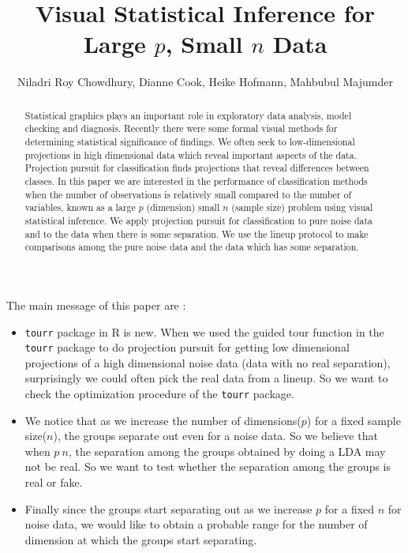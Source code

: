 \documentclass[12]{article}
\begin{document}


\title{Visual Statistical Inference for Large $p$, Small $n$ Data}\label{ch:largepsmalln}
\vspace{-0.8cm}
\author{Niladri Roy Chowdhury, Dianne Cook, Heike Hofmann, Mahbubul Majumder}



\maketitle

\begin{abstract}
Statistical graphics plays an important role in exploratory data analysis, model checking and diagnosis. Recently there were some formal visual methods for determining statistical significance of findings. We often seek to low-dimensional projections in high dimensional data which reveal important aspects of the data. Projection pursuit for classification finds projections that reveal differences between classes. In this paper we are interested in the performance of classification methods when the number of observations is relatively small compared to the number of variables, known as a large $p$ (dimension) small $n$ (sample size) problem using visual statistical inference. We apply projection pursuit for classification to pure noise data and to the data when there is some separation. We use the lineup protocol \cite{buja:2009} to make comparisons among the pure noise data and the data which has some separation.

\end{abstract}

{\color{red} The main message of this paper are :
\begin{itemize}
\item \texttt{tourr} package in R is new. When we used the guided tour function in the \texttt{tourr} package to do projection pursuit for getting low dimensional projections of a high dimensional noise data (data with no real separation), surprisingly we could often pick the real data from a lineup. So we want to check the optimization procedure of the \texttt{tourr} package.
\item  We notice that as we increase the number of dimensions($p$) for a fixed sample size($n$), the groups separate out even for a noise data. So we believe that when $p ~ n$, the separation among the groups obtained by doing a LDA may not be real. So we want to test whether the separation among the groups is real or fake.
\item Finally  since the groups start separating out as we increase $p$ for a fixed $n$ for noise data, we would like to obtain a probable range for the number of dimension at which the groups start separating. 
\end{itemize} }
\end{document}
